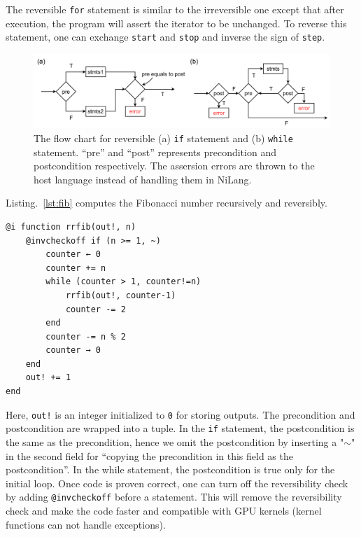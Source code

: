 \documentclass{article}
\newcommand{\<}{\langle}
\renewcommand{\>}{\rangle}
\newcommand{\Lst}[1]{Listing.~\ref{#1}}
\theoremstyle{definition}\newtheorem{definition}{\textit{Definition}}
\begin{document}
The reversible \texttt{for} statement is similar to the irreversible one except that after execution, the program will assert the iterator to be unchanged. To reverse this statement, one can exchange \texttt{start} and \texttt{stop} and inverse the sign of \texttt{step}.
\begin{figure}
    \centerline{\includegraphics[width=0.9\columnwidth,trim={0 0cm 0 0cm},clip]{controlflow.pdf}}
    \caption{The flow chart for reversible (a) \texttt{if} statement and (b) \texttt{while} statement. ``pre'' and ``post'' represents precondition and postcondition respectively. The assersion errors are thrown to the host language instead of handling them in NiLang.}\label{fig:controlflow}
\end{figure}
\Lst{lst:fib} computes the Fibonacci number recursively and reversibly.

\begin{minipage}{.88\columnwidth}
\begin{lstlisting}[mathescape=true,caption={Computing Fibonacci number recursively and reversibly.},label={lst:fib}]
@i function rrfib(out!, n)
    @invcheckoff if (n >= 1, ~)
        counter ← 0
        counter += n
        while (counter > 1, counter!=n)
            rrfib(out!, counter-1)
            counter -= 2
        end
        counter -= n % 2
        counter → 0
    end
    out! += 1
end
\end{lstlisting}
\end{minipage}

Here, \texttt{out!} is an integer initialized to \texttt{0} for storing outputs.
The precondition and postcondition are wrapped into a tuple. In the \texttt{if} statement, the postcondition is the same as the precondition, hence we omit the postcondition by inserting a "\texttt{$\sim$}" in the second field for ``copying the precondition in this field as the postcondition''.
In the while statement, the postcondition is true only for the initial loop.
Once code is proven correct, one can turn off the reversibility check by adding \texttt{@invcheckoff} before a statement.
This will remove the reversibility check and make the code faster and compatible with GPU kernels (kernel functions can not handle exceptions).
\end{document}
